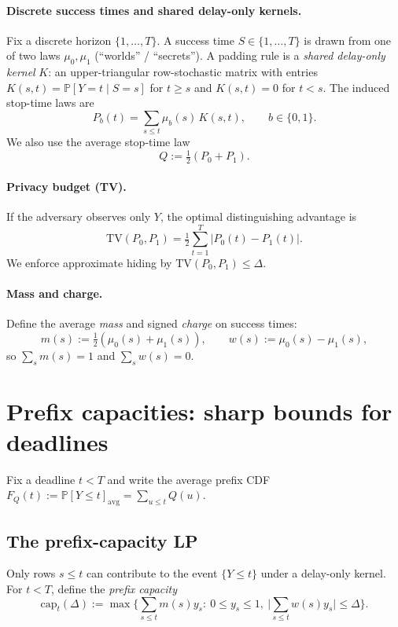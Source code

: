 \documentclass[11pt]{article}
\newcommand{\TV}{\mathrm{TV}}
\newcommand{\Prb}{\mathbb{P}}
\begin{document}
\paragraph{Discrete success times and shared delay-only kernels.}
Fix a discrete horizon $\{1,\dots,T\}$.
A success time $S\in\{1,\dots,T\}$ is drawn from one of two laws $\mu_0,\mu_1$ (``worlds'' / ``secrets'').
A padding rule is a \emph{shared delay-only kernel} $K$:
an upper-triangular row-stochastic matrix with entries $K(s,t)=\Prb[Y=t\mid S=s]$ for $t\ge s$ and $K(s,t)=0$ for $t<s$.
The induced stop-time laws are
\[
P_b(t) = \sum_{s\le t} \mu_b(s)\,K(s,t),\qquad b\in\{0,1\}.
\]
We also use the average stop-time law
\[
Q := \tfrac12(P_0+P_1).
\]

\paragraph{Privacy budget (TV).}
If the adversary observes only $Y$, the optimal distinguishing advantage is
\[
\TV(P_0,P_1)=\tfrac12\sum_{t=1}^T |P_0(t)-P_1(t)|.
\]
We enforce approximate hiding by $\TV(P_0,P_1)\le \Delta$.

\paragraph{Mass and charge.}
Define the average \emph{mass} and signed \emph{charge} on success times:
\[
m(s) := \tfrac12(\mu_0(s)+\mu_1(s)),\qquad
w(s) := \mu_0(s)-\mu_1(s),
\]
so $\sum_s m(s)=1$ and $\sum_s w(s)=0$.

\section{Prefix capacities: sharp bounds for deadlines}\label{sec:capacity}

Fix a deadline $t<T$ and write the average prefix CDF $F_Q(t):=\Prb[Y\le t]_{\mathrm{avg}}=\sum_{u\le t} Q(u)$.

\subsection{The prefix-capacity LP}
Only rows $s\le t$ can contribute to the event $\{Y\le t\}$ under a delay-only kernel.
For $t<T$, define the \emph{prefix capacity}
\begin{equation}\label{eq:cap}
\mathrm{cap}_t(\Delta)
:=
\max\Big\{\sum_{s\le t}m(s)y_s:\ 0\le y_s\le 1,\ \big|\sum_{s\le t}w(s)y_s\big|\le \Delta\Big\}.
\end{equation}
\end{document}
